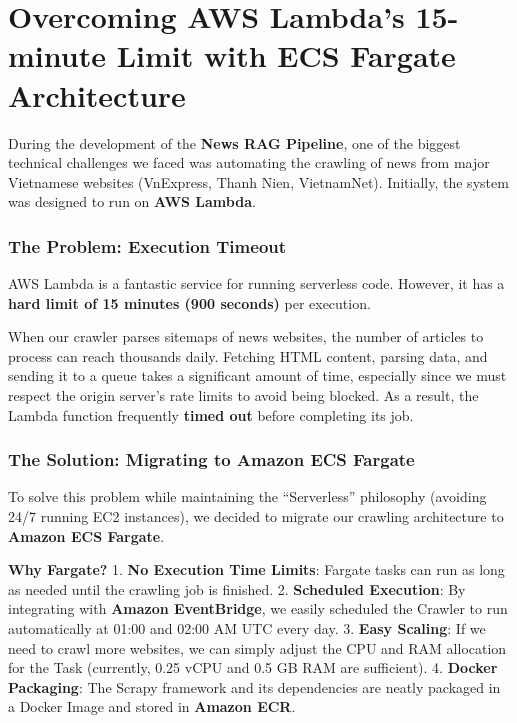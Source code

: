 \hypertarget{overcoming-aws-lambdas-15-minute-limit-with-ecs-fargate-architecture}{%
\section{Overcoming AWS Lambda's 15-minute Limit with ECS Fargate
Architecture}}

During the development of the \textbf{News RAG Pipeline}, one of the
biggest technical challenges we faced was automating the crawling of
news from major Vietnamese websites (VnExpress, Thanh Nien, VietnamNet).
Initially, the system was designed to run on \textbf{AWS Lambda}.

\hypertarget{the-problem-execution-timeout}{%
\subsubsection{The Problem: Execution
Timeout}}

AWS Lambda is a fantastic service for running serverless code. However,
it has a \textbf{hard limit of 15 minutes (900 seconds)} per execution.

When our crawler parses sitemaps of news websites, the number of
articles to process can reach thousands daily. Fetching HTML content,
parsing data, and sending it to a queue takes a significant amount of
time, especially since we must respect the origin server's rate limits
to avoid being blocked. As a result, the Lambda function frequently
\textbf{timed out} before completing its job.

\hypertarget{the-solution-migrating-to-amazon-ecs-fargate}{%
\subsubsection{The Solution: Migrating to Amazon ECS
Fargate}}

To solve this problem while maintaining the ``Serverless'' philosophy
(avoiding 24/7 running EC2 instances), we decided to migrate our
crawling architecture to \textbf{Amazon ECS Fargate}.

\textbf{Why Fargate?} 1. \textbf{No Execution Time Limits}: Fargate
tasks can run as long as needed until the crawling job is finished. 2.
\textbf{Scheduled Execution}: By integrating with \textbf{Amazon
EventBridge}, we easily scheduled the Crawler to run automatically at
01:00 and 02:00 AM UTC every day. 3. \textbf{Easy Scaling}: If we need
to crawl more websites, we can simply adjust the CPU and RAM allocation
for the Task (currently, 0.25 vCPU and 0.5 GB RAM are sufficient). 4.
\textbf{Docker Packaging}: The Scrapy framework and its dependencies are
neatly packaged in a Docker Image and stored in \textbf{Amazon ECR}.

